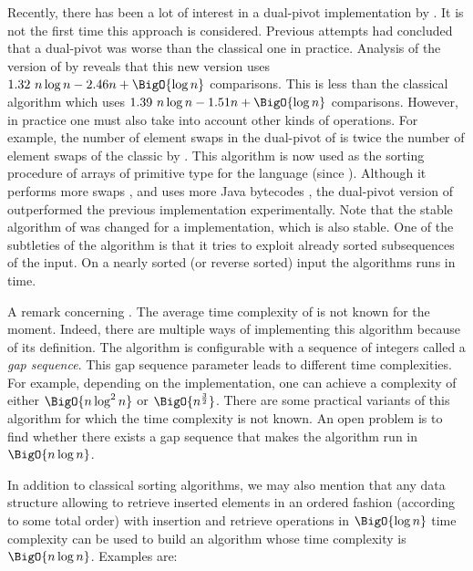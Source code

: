 Recently, there has been a lot of interest in a dual-pivot \quicksort
implementation by \citet*{yaroslavskiy:2009}. It is not the first time this
approach is considered. Previous attempts \cite{sedgewick:1980} had concluded
that a dual-pivot \quicksort was worse than the classical one in practice.
Analysis of the version of \citet*{yaroslavskiy:2009} by \citet*{wild:2012}
reveals that this new version uses \(1.32~n \log n - 2.46n + \BigO{\log n}\)
comparisons.  This is less than the classical \quicksort algorithm which uses
\(1.39~n \log n
- 1.51n + \BigO{\log n}\) comparisons. However, in practice one must also take into account
  other kinds of operations. For example, the number of element swaps in the
dual-pivot \quicksort of \citeauthor{yaroslavskiy:2009} is twice the number of
element swaps of the classic \quicksort by \citeauthor{hoare:1962}. This
algorithm is now used as the sorting procedure of arrays of primitive type for
the \Java language (since ). Although it performs more
swaps \cite{wild:2012}, and uses more Java bytecodes \cite{wild:2013}, the
dual-pivot version of \citet*{yaroslavskiy:2009} outperformed the previous
\quicksort implementation experimentally. Note that the stable \mergesort
algorithm of  was changed for a \timsort implementation, which is
also stable. One of the subtleties of the \timsort algorithm is that it tries
to exploit already sorted subsequences of the input. On a nearly sorted (or
reverse sorted) input the \timsort algorithms runs in  time.

A remark concerning \shellsort. The average time complexity of \shellsort is not
known for the moment. Indeed, there are multiple ways of implementing this
algorithm because of its definition. The \shellsort algorithm is configurable
with a sequence of integers called a \emph{gap sequence}. This gap sequence
parameter leads to different time complexities. For example, depending on the
implementation, one can achieve a complexity of either $\BigO{n \log^2 n}$ or
$\BigO{n^{\frac{3}{2}}}$. There are some practical variants of this algorithm
for which the time complexity is not known. An open problem is to find whether
there exists a gap sequence that makes the algorithm run in $\BigO{n \log
n}$.

In addition to classical sorting algorithms, we may also mention that any data
structure allowing to retrieve inserted elements in an ordered fashion
(according to some total order) with insertion and retrieve operations in
$\BigO{\log n}$ time complexity can be used to build an algorithm whose time
complexity is $\BigO{n \log n}$. Examples are:

